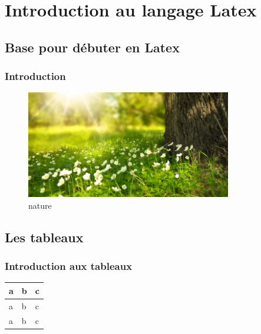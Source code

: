 \documentclass{report}
\begin{document}
\tableofcontents
\part{Introduction au langage Latex}
\chapter{Base pour débuter en Latex}
\section{Introduction}
\lipsum[1-2]
\begin{figure}
    \centering
    \includegraphics[width=0.8\textwidth]{nature.png}
    \caption{nature}
\end{figure}
 \chapter{Les tableaux}   
 \section{Introduction aux tableaux}
 \lipsum[1-2]
\begin{table}
    \centering
    \begin{tabular}{|l|l|l|}
        \hline
        a & b & c \\
        \hline
        a & b & c \\
        \hline
        a & b & c \\
        \hline
    \end{tabular}
\end{table}
 
\end{document}
